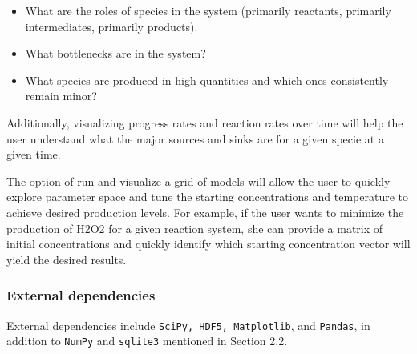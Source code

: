 \documentclass[12pt]{article}
\begin{document}
\begin{itemize}

\item What are the roles of species in the system (primarily reactants, primarily intermediates, primarily products).
\item What bottlenecks are in the system?
\item What species are produced in high quantities and which ones consistently remain minor?

\end{itemize}

Additionally, visualizing progress rates and reaction rates over time will help the user understand what the major sources and sinks are for a given specie at a given time. 

The option of run and visualize a grid of models will allow the user to quickly explore parameter space and tune the starting concentrations and temperature to achieve desired production levels. For example, if the user wants to minimize the production of H2O2 for a given reaction system, she can provide a matrix of initial concentrations and quickly identify which starting concentration vector will yield the desired results. 

\subsubsection{External dependencies}
External dependencies include \texttt{SciPy, HDF5, Matplotlib}, and \texttt{Pandas}, in addition to \texttt{NumPy} and \texttt{sqlite3} mentioned in Section 2.2. 
\end{document}
